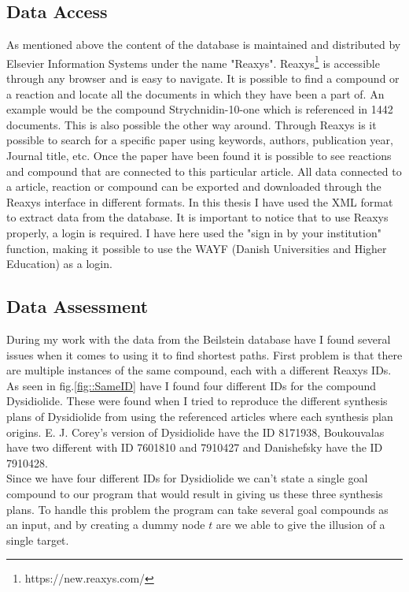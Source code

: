 \documentclass[a4paper,10pt,titlepage]{paper}
\begin{document}
\subsection{Data Access}
As mentioned above the content of the database is maintained and distributed by Elsevier Information Systems under the name "Reaxys". Reaxys\footnote{https://new.reaxys.com/} is accessible through any browser and is easy to navigate. It is possible to find a compound or a reaction and locate all the documents in which they have been a part of. An example would be the compound Strychnidin-10-one which is referenced in 1442 documents. This is also possible the other way around. Through Reaxys is it possible to search for a specific paper using keywords, authors, publication year, Journal title, etc. Once the paper have been found it is possible to see reactions and compound that are connected to this particular article. All data connected to a article, reaction or compound can be exported and downloaded through the Reaxys interface in different formats. In this thesis I have used the XML format to extract data from the database. It is important to notice that to use Reaxys properly, a login is required. I have here used the "sign in by your institution" function, making it possible to use the WAYF (Danish Universities and Higher Education) as a login.
\subsection{Data Assessment}
During my work with the data from the Beilstein database have I found several issues when it comes to using it to find shortest paths.
First problem is that there are multiple instances of the same compound, each with a different Reaxys IDs. As seen in fig.\ref{fig::SameID} have I found four different IDs for the compound Dysidiolide. These were found when I tried to reproduce the different synthesis plans of Dysidiolide from \cite{SynthesisPlans} using the referenced articles where each synthesis plan origins. E. J. Corey's version of Dysidiolide have the ID 8171938, Boukouvalas have two different with ID 7601810 and 7910427 and Danishefsky have the ID 7910428. \\
Since we have four different IDs for Dysidiolide we can't state a single goal compound to our program that would result in giving us these three synthesis plans. To handle this problem the program can take several goal compounds as an input, and by creating a dummy node $t$ are we able to give the illusion of a single target.
\end{document}
